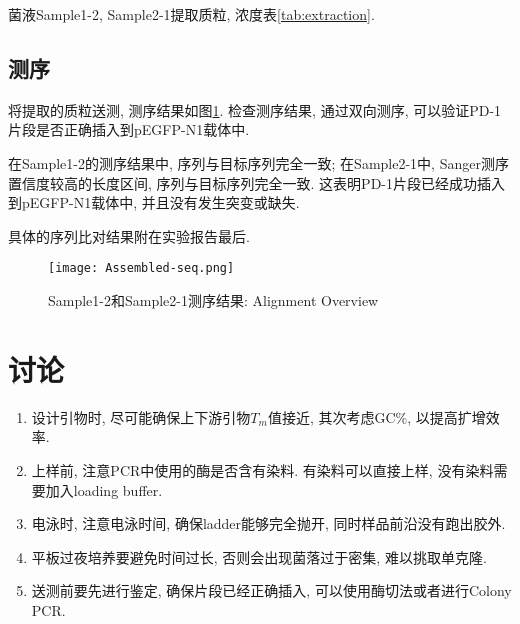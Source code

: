 \documentclass{article}
\begin{document}
菌液Sample1-2, Sample2-1提取质粒, 浓度表\ref{tab:extraction}.

\subsection{测序}

将提取的质粒送测, 测序结果如图\ref{fig:sequencing}. 检查测序结果, 通过双向测序, 可以验证PD-1片段是否正确插入到pEGFP-N1载体中.

在Sample1-2的测序结果中, 序列与目标序列完全一致; 在Sample2-1中, Sanger测序置信度较高的长度区间, 序列与目标序列完全一致. 这表明PD-1片段已经成功插入到pEGFP-N1载体中, 并且没有发生突变或缺失.

具体的序列比对结果附在实验报告最后.

\begin{figure}[htbp]
    \centering
    \texttt{[image: Assembled-seq.png]}
    \caption{Sample1-2和Sample2-1测序结果: Alignment Overview}
    \label{fig:sequencing}
\end{figure}

\section{讨论}

\begin{enumerate}
    \item 设计引物时, 尽可能确保上下游引物$T_m$值接近, 其次考虑$\mbox{GC}\%$, 以提高扩增效率.
    \item 上样前, 注意PCR中使用的酶是否含有染料. 有染料可以直接上样, 没有染料需要加入loading buffer.
    \item 电泳时, 注意电泳时间, 确保ladder能够完全抛开, 同时样品前沿没有跑出胶外.
    \item 平板过夜培养要避免时间过长, 否则会出现菌落过于密集, 难以挑取单克隆.
    \item 送测前要先进行鉴定, 确保片段已经正确插入, 可以使用酶切法或者进行Colony PCR.
\end{enumerate}
\end{document}
